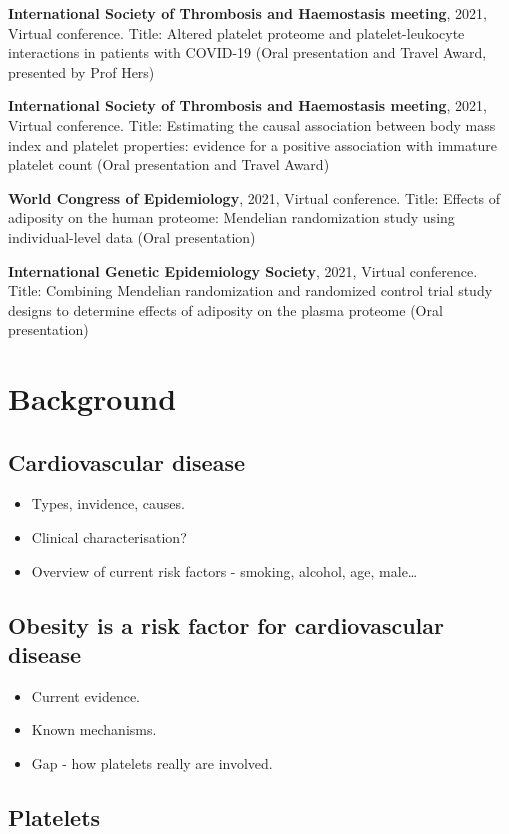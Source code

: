 \documentclass[11pt,twoside]{bristolthesis}
\providecommand{\tightlist}{%
  \setlength{\itemsep}{0pt}\setlength{\parskip}{0pt}}
\begin{document}
\textbf{International Society of Thrombosis and Haemostasis meeting}, 2021, Virtual conference. Title: Altered platelet proteome and platelet-leukocyte interactions in patients with COVID-19 (Oral presentation and Travel Award, presented by Prof Hers)

\textbf{International Society of Thrombosis and Haemostasis meeting}, 2021, Virtual conference. Title: Estimating the causal association between body mass index and platelet properties: evidence for a positive association with immature platelet count (Oral presentation and Travel Award)

\textbf{World Congress of Epidemiology}, 2021, Virtual conference. Title: Effects of adiposity on the human proteome: Mendelian randomization study using individual-level data (Oral presentation)

\textbf{International Genetic Epidemiology Society}, 2021, Virtual conference. Title: Combining Mendelian randomization and randomized control trial study designs to determine effects of adiposity on the plasma proteome (Oral presentation)

\hypertarget{background}{%
\chapter{Background}\label{background}}

\hypertarget{cardiovascular-disease}{%
\section{Cardiovascular disease}\label{cardiovascular-disease}}
\begin{itemize}
\tightlist
\item
  Types, invidence, causes.
\item
  Clinical characterisation?
\item
  Overview of current risk factors - smoking, alcohol, age, male\ldots{}
\end{itemize}
\hypertarget{obesity-is-a-risk-factor-for-cardiovascular-disease}{%
\section{Obesity is a risk factor for cardiovascular disease}\label{obesity-is-a-risk-factor-for-cardiovascular-disease}}
\begin{itemize}
\tightlist
\item
  Current evidence.
\item
  Known mechanisms.
\item
  Gap - how platelets really are involved.
\end{itemize}
\hypertarget{platelets}{%
\section{Platelets}\label{platelets}}
\end{document}
